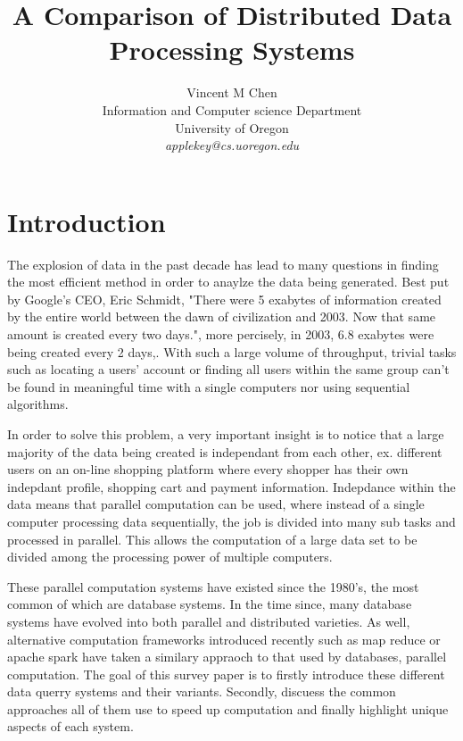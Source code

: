 \documentclass[10pt,twocolumn]{IEEEtran11}
\begin{document}


\title{\Large \bf A Comparison of Distributed Data Processing Systems}
\author{
Vincent M Chen\\
Information and Computer science Department\\
University of Oregon\\
{\em applekey@cs.uoregon.edu}
}
\maketitle

\section{Introduction}
The explosion of data in the past decade has lead to many questions in finding the most efficient method in order to anaylze the data being generated. Best put by Google's CEO, Eric Schmidt, "There were 5 exabytes of information created by the entire world between the dawn of civilization and 2003. Now that same amount is created every two days.", more percisely, in 2003, 6.8 exabytes were being created every 2 days,\cite{gantz2010digital}.  With such a large volume of throughput, trivial tasks such as locating a users' account or finding all users within the same group can't be found in meaningful time with a single computers nor using sequential algorithms.
\par
In order to solve this problem, a very important insight is to notice that a large majority of the data being created is independant from each other, ex. different users on an on-line shopping platform where every shopper has their own indepdant profile, shopping cart and payment information.  Indepdance within the data means that parallel computation can be used, where instead of a single computer processing data sequentially, the job is divided into many sub tasks and processed in parallel.  This allows the computation of a large data set to be divided among the processing power of multiple computers.
\par
These parallel computation systems have existed since the 1980's, the most common of which are database systems. In the time since, many database systems have evolved into both parallel and distributed varieties.  As well, alternative computation frameworks introduced recently such as map reduce or apache spark have taken a  similary appraoch to that used by databases, parallel computation.  The goal of this survey paper is to firstly introduce these different data querry systems and their variants.  Secondly, discuess the common approaches all of them use to speed up computation and finally highlight unique aspects of each system.
\end{document}
